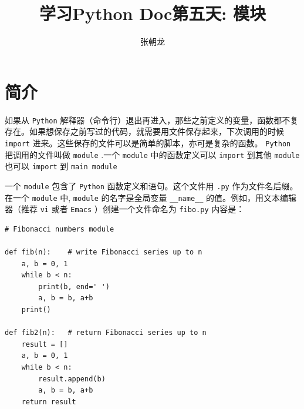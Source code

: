 \documentclass[10pt,a4paper,UTF8]{article}
\author{张朝龙}
\date{}
\title{学习Python Doc第五天: 模块}
\begin{document}
\maketitle
\tableofcontents
{}

\section{简介}
\label{sec:orge2313e9}


如果从 \texttt{Python} 解释器（命令行）退出再进入，那些之前定义的变量，函数都不复存在。如果想保存之前写过的代码，就需要用文件保存起来，下次调用的时候 \texttt{import} 进来。这些保存的文件可以是简单的脚本，亦可是复杂的函数。 \texttt{Python} 把调用的文件叫做 \texttt{module} .一个 \texttt{module} 中的函数定义可以 \texttt{import} 到其他 \texttt{module} 也可以 \texttt{import} 到 \texttt{main module} 

一个 \texttt{module} 包含了 \texttt{Python} 函数定义和语句。这个文件用 \texttt{.py} 作为文件名后缀。 在一个 \texttt{module} 中,  \texttt{module} 的名字是全局变量 \texttt{\_\_name\_\_} 的值。例如，用文本编辑器（推荐 \texttt{vi} 或者 \texttt{Emacs} ）创建一个文件命名为 \texttt{fibo.py} 内容是：
\lstset{language=Python,label= ,caption= ,captionpos=b,numbers=none}
\begin{lstlisting}
# Fibonacci numbers module

def fib(n):    # write Fibonacci series up to n
    a, b = 0, 1
    while b < n:
        print(b, end=' ')
        a, b = b, a+b
    print()

def fib2(n):   # return Fibonacci series up to n
    result = []
    a, b = 0, 1
    while b < n:
        result.append(b)
        a, b = b, a+b
    return result
\end{lstlisting}
\end{document}
